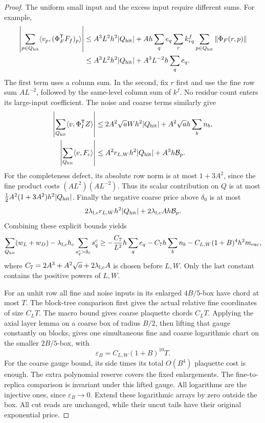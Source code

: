 \documentclass[11pt,reqno]{amsart}
\numberwithin{equation}{section}
\theoremstyle{definition}
\theoremstyle{remark}
\begin{document}
\begin{proof}
The uniform small input and the excess input require different
sums. For example,
\begin{align*}
 \left|\sum_{p\in Q_{\rm hit}}\langle v_p,(\Phi_F^{\mathsf T}F_f)_p\rangle\right|
 &\le A^3L^2h^2|Q_{\rm hit}|
    +Ah\sum_qe_q\sum_r k^f_{rq}\sum_{p\in Q_{\rm hit}}\|\Phi_F(r,p)\|\\
 &\le A^3L^2h^2|Q_{\rm hit}|+A^3L^{-2}h\sum_qe_q.
\end{align*}
The first term uses a column sum. In the second, fix \(r\)
first and use the fine row sum \(AL^{-2}\), followed by the
same-level column sum of \(k^f\). No residue count enters its
large-input coefficient. The noise and coarse terms similarly
give
\begin{align*}
 \left|\sum_{Q_{\rm hit}}\langle v,\Phi_I^{\mathsf T}Z\rangle\right|
       &\le2A^2\sqrt a Wh^2|Q_{\rm hit}|+A^2\sqrt a h\sum_bn_b,\\
 \left|\sum_{Q_{\rm hit}}\langle v,F_c\rangle\right|
       &\le A^2r_{L,W}h^2|Q_{\rm hit}|+A^3h\mathcal B_p.
\end{align*}
For the completeness defect, its absolute row norm is at most
\(1+3A^2\), since the fine product costs
\((AL^2)(AL^{-2})\). Thus its scalar contribution on \(Q\)
is at most \(\frac12 A^2(1+3A^2)h^2|Q_{\rm hit}|\).
Finally the negative coarse price above \(\delta_0\) is at most
\[
 2\lambda_{{\rm l},c}r_{L,W}h^2|Q_{\rm hit}|
                              +2\lambda_{{\rm l},c}A h\mathcal B_p.
\]
Combining these explicit bounds yields
\begin{equation}
 \sum_{Q_{\rm hit}}(w_L+w_D)-\lambda_{{\rm l},c}h_c
                       \sum_{s_q^c>\delta_0}s_q^c
 \ge-\frac{C_7}{L^2}h\sum_qe_q-C_7h\sum_bn_b
                    -C_{L,W}(1+B)^4h^2m_{\rm exc},
 \label{eq:packet-hit-budget}
\end{equation}
where \(C_7=2A^3+A^2\sqrt a+2\lambda_{{\rm l},c}A\)
is chosen before \(L,W\). Only the last constant contains
the positive powers of \(L,W\).

For an unhit row all fine and noise inputs in its enlarged
\(4B/5\)-box have chord at most \(T\).
The block-tree comparison first gives the actual relative
fine coordinates of size \(C_LT\). The macro bound gives
coarse plaquette chords \(C_LT\). Applying the axial layer
lemma on a coarse box of radius \(B/2\), then lifting that
gauge constantly on blocks, gives one simultaneous fine and
coarse logarithmic chart on the smaller \(2B/5\)-box, with
\[
                          \varepsilon_B=C_{L,W}(1+B)^{10}T.
\]
For the coarse gauge bound, its side times its total
\(O(B^4)\) plaquette cost is enough. The extra polynomial
reserve covers the fixed enlargements. The fine-to-replica
comparison is invariant under this lifted gauge. All logarithms
are the injective ones, since \(\varepsilon_B\to0\).
Extend these logarithmic arrays by zero outside the box. All
cut reads are unchanged, while their uncut tails have their
original exponential price.


\end{proof}
\end{document}
